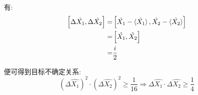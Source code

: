 \documentclass[twoside]{article}
\begin{document}
有:
\begin{equation*}
    \begin{split}
        \left[\Delta \hat{X_1}, \Delta \hat{X_2}\right] = & \left[\hat{X_1} - \braket{\hat{X_1}}, \hat{X_2} - \braket{\hat{X_2}}\right] \\
        =                                                 & \left[\hat{X_1}, \hat{X_2}\right]                                           \\
        =                                                 & \frac{i}{2}
    \end{split}
\end{equation*}


便可得到目标不确定关系:
\begin{equation*}
    \left(\Delta \hat{X_1}\right)^2 \cdot \left(\Delta \hat{X_2}\right)^2  \geqslant \frac{1}{16}  \Rightarrow \Delta \hat{X_1} \cdot \Delta \hat{X_2} \geqslant \frac{1}{4}
\end{equation*}
\end{document}
